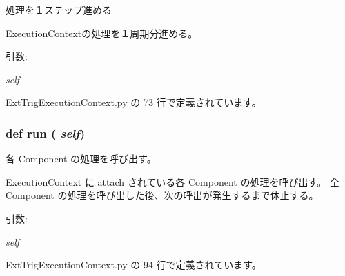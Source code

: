処理を１ステップ進める 

ExecutionContextの処理を１周期分進める。

\begin{Desc}
\item[引数:]
\begin{description}
\item[{\em self}]\end{description}
\end{Desc}


 ExtTrigExecutionContext.py の 73 行で定義されています。
\subsubsection{\setlength{\rightskip}{0pt plus 5cm}def run ( {\em self})}\label{classsource__py_1_1_ext_trig_execution_context_1_1_ext_trig_execution_context_edcaade7dd45761ddcc3b3cc07005314}


各 Component の処理を呼び出す。 

ExecutionContext に attach されている各 Component の処理を呼び出す。 全 Component の処理を呼び出した後、次の呼出が発生するまで休止する。

\begin{Desc}
\item[引数:]
\begin{description}
\item[{\em self}]\end{description}
\end{Desc}


 ExtTrigExecutionContext.py の 94 行で定義されています。